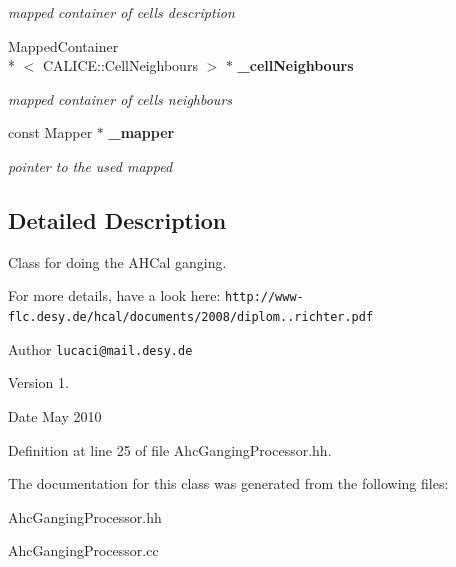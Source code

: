 \begin{DoxyCompactItemize}
\begin{DoxyCompactList}\small\item\em mapped container of cells description \end{DoxyCompactList}\item 
Mapped\-Container\\*
$<$ C\-A\-L\-I\-C\-E\-::\-Cell\-Neighbours $>$ $\ast$ {\bf \-\_\-cell\-Neighbours}\label{classCALICE_1_1AhcGangingProcessor_a5b0f853b298a53cea88ea6120b811afc}

\begin{DoxyCompactList}\small\item\em mapped container of cells neighbours \end{DoxyCompactList}\item 
const Mapper $\ast$ {\bf \-\_\-mapper}\label{classCALICE_1_1AhcGangingProcessor_acc9c305676156405e7d5e70464205d85}

\begin{DoxyCompactList}\small\item\em pointer to the used mapped \end{DoxyCompactList}\end{DoxyCompactItemize}


\subsection{Detailed Description}
Class for doing the A\-H\-Cal ganging. 

For more details, have a look here\-: {\tt http\-://www-\/flc.\-desy.\-de/hcal/documents/2008/diplom..\-richter.\-pdf}

\begin{DoxyAuthor}{Author}
{\tt lucaci@mail.\-desy.\-de} 
\end{DoxyAuthor}
\begin{DoxyVersion}{Version}
1. 
\end{DoxyVersion}
\begin{DoxyDate}{Date}
May 2010 
\end{DoxyDate}


Definition at line 25 of file Ahc\-Ganging\-Processor.\-hh.



The documentation for this class was generated from the following files\-:\begin{DoxyCompactItemize}
\item 
Ahc\-Ganging\-Processor.\-hh\item 
Ahc\-Ganging\-Processor.\-cc\end{DoxyCompactItemize}
